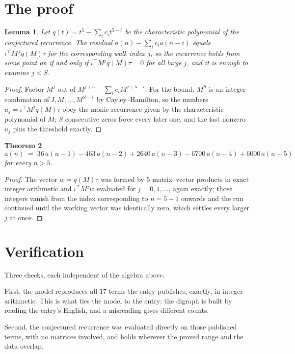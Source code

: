 \documentclass[11pt,a4paper]{article}
\theoremstyle{plain}
\newtheorem{theorem}{Theorem}
\newtheorem{lemma}[theorem]{Lemma}
\theoremstyle{definition}
\begin{document}
\section{The proof}

\begin{lemma}\label{lem:crit}
Let $q(t)=t^{5}-\sum_i c_it^{5-i}$ be the characteristic polynomial of the
conjectured recurrence. The residual $a(n)-\sum_ic_ia(n-i)$ equals
$\iota^{\!\top}M^{\,j}q(M)\tau$ for the corresponding walk index $j$, so the recurrence
holds from some point on if and only if $\iota^{\!\top}M^{j}q(M)\tau=0$ for all large $j$,
and it is enough to examine $j<S$.
\end{lemma}

\begin{proof}
Factor $M^{j}$ out of $M^{j+5}-\sum_ic_iM^{j+5-i}$. For the bound, $M^{S}$
is an integer combination of $I,M,\dots,M^{S-1}$ by Cayley--Hamilton, so the numbers
$u_j=\iota^{\!\top}M^{j}q(M)\tau$ obey the monic recurrence given by the characteristic
polynomial of $M$; $S$ consecutive zeros force every later one, and the last nonzero $u_j$
pins the threshold exactly.
\end{proof}

\begin{theorem}
\[
a(n)\;=\;36\,a(n-1) - 463\,a(n-2) + 2640\,a(n-3) - 6700\,a(n-4) + 6000\,a(n-5)
\]
for every $n>5$.
\end{theorem}

\begin{proof}
The vector $w=q(M)\tau$ was formed by $5$ matrix--vector products in exact integer
arithmetic and $\iota^{\!\top}M^{j}w$ evaluated for $j=0,1,\dots$, again exactly; those
integers vanish from the index corresponding to $n=5+1$ onwards and the run continued
until the working vector was identically zero, which settles every larger $j$ at once.
\end{proof}

\section{Verification}

Three checks, each independent of the algebra above.

First, the model reproduces all $17$ terms the entry publishes, exactly, in integer
arithmetic. This is what ties the model to the entry: the digraph is built by reading the
entry's English, and a misreading gives different counts.

Second, the conjectured recurrence was evaluated directly on those published terms, with no
matrices involved, and holds wherever the proved range and the data overlap.
\end{document}
